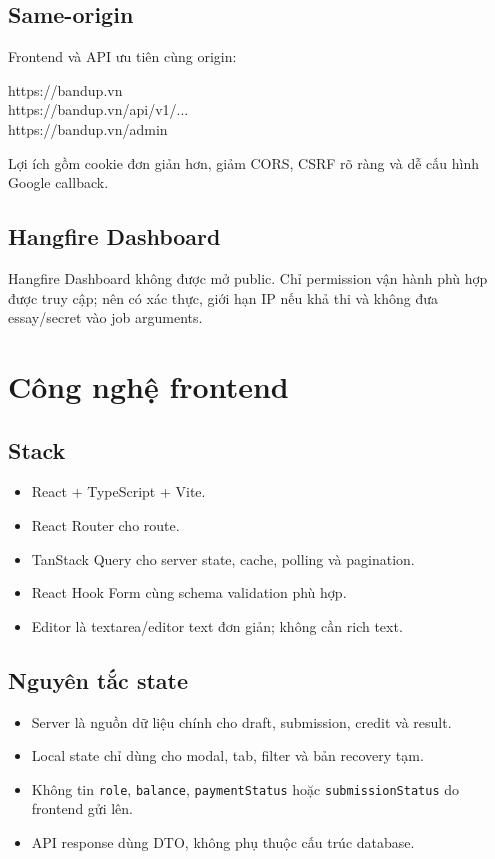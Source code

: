 \documentclass[11pt,a4paper]{article}
\begin{document}
\subsection{Same-origin}
Frontend và API ưu tiên cùng origin:
\begin{codebox}
https://bandup.vn\\
https://bandup.vn/api/v1/...\\
https://bandup.vn/admin
\end{codebox}
Lợi ích gồm cookie đơn giản hơn, giảm CORS, CSRF rõ ràng và dễ cấu hình Google callback.

\subsection{Hangfire Dashboard}
\begin{warningbox}
Hangfire Dashboard không được mở public. Chỉ permission vận hành phù hợp được truy cập; nên có xác thực, giới hạn IP nếu khả thi và không đưa essay/secret vào job arguments.
\end{warningbox}

\section{Công nghệ frontend}

\subsection{Stack}
\begin{itemize}
  \item React + TypeScript + Vite.
  \item React Router cho route.
  \item TanStack Query cho server state, cache, polling và pagination.
  \item React Hook Form cùng schema validation phù hợp.
  \item Editor là textarea/editor text đơn giản; không cần rich text.
\end{itemize}

\subsection{Nguyên tắc state}
\begin{itemize}
  \item Server là nguồn dữ liệu chính cho draft, submission, credit và result.
  \item Local state chỉ dùng cho modal, tab, filter và bản recovery tạm.
  \item Không tin \texttt{role}, \texttt{balance}, \texttt{paymentStatus} hoặc \texttt{submissionStatus} do frontend gửi lên.
  \item API response dùng DTO, không phụ thuộc cấu trúc database.
\end{itemize}
\end{document}
